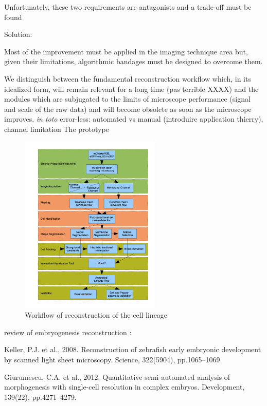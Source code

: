   Unfortunately, these two requirements are antagonists and a trade-off must be found 

  Solution:  

  Most of the improvement must be applied in the imaging technique area but, given their limitations, algorithmic bandages must be designed to overcome them.  

  We distinguish between the fundamental reconstruction workflow which, in its idealized form, will remain relevant for a long time (pas terrible XXXX) and the modules which are subjugated to the limits of microscope performance (signal and scale of the raw data) and will become obsolete as soon as the microscope improves. \textit{in toto}  error-less: automated vs manual (introduire application thierry),  channel limitation    The prototype                     
\begin{figure}
\begin{center}
\includegraphics[width=0.6\textwidth]{../../images/Reconstruction/bioemergences/FigureWorkflow/Workflow2.png}
\end{center}
\caption{Workflow of reconstruction of the cell lineage}
\label{bioemergences_FigureWorkflow_Workflow2}
\end{figure}

  review of embryogenesis reconstruction : 

  Keller, P.J. et al., 2008. Reconstruction of zebrafish early embryonic development by scanned light sheet microscopy. Science, 322(5904), pp.1065–1069. \cite{Keller:2008km}

  Giurumescu, C.A. et al., 2012. Quantitative semi-automated analysis of morphogenesis with single-cell resolution in complex embryos. Development, 139(22), pp.4271–4279. \cite{Giurumescu:2012ej}

